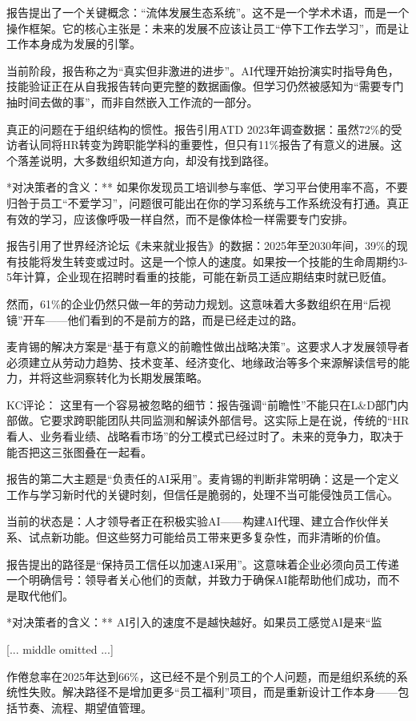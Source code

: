 \documentclass[11pt]{ctexart}
\begin{document}
报告提出了一个关键概念：“流体发展生态系统”。这不是一个学术术语，而是一个操作框架。它的核心主张是：未来的发展不应该让员工“停下工作去学习”，而是让工作本身成为发展的引擎。

当前阶段，报告称之为“真实但非激进的进步”。AI代理开始扮演实时指导角色，技能验证正在从自我报告转向更完整的数据画像。但学习仍然被感知为“需要专门抽时间去做的事”，而非自然嵌入工作流的一部分。

真正的问题在于组织结构的惯性。报告引用ATD 2023年调查数据：虽然72\%的受访者认同将HR转变为跨职能学科的重要性，但只有11\%报告了有意义的进展。这个落差说明，大多数组织知道方向，却没有找到路径。

*对决策者的含义：** 如果你发现员工培训参与率低、学习平台使用率不高，不要归咎于员工“不爱学习”，问题很可能出在你的学习系统与工作系统没有打通。真正有效的学习，应该像呼吸一样自然，而不是像体检一样需要专门安排。

报告引用了世界经济论坛《未来就业报告》的数据：2025年至2030年间，39\%的现有技能将发生转变或过时。这是一个惊人的速度。如果按一个技能的生命周期约3-5年计算，企业现在招聘时看重的技能，可能在新员工适应期结束时就已贬值。

然而，61\%的企业仍然只做一年的劳动力规划。这意味着大多数组织在用“后视镜”开车——他们看到的不是前方的路，而是已经走过的路。

麦肯锡的解决方案是“基于有意义的前瞻性做出战略决策”。这要求人才发展领导者必须建立从劳动力趋势、技术变革、经济变化、地缘政治等多个来源解读信号的能力，并将这些洞察转化为长期发展策略。

KC评论： 这里有一个容易被忽略的细节：报告强调“前瞻性”不能只在L\&D部门内部做。它要求跨职能团队共同监测和解读外部信号。这实际上是在说，传统的“HR看人、业务看业绩、战略看市场”的分工模式已经过时了。未来的竞争力，取决于能否把这三张图叠在一起看。

报告的第二大主题是“负责任的AI采用”。麦肯锡的判断非常明确：这是一个定义工作与学习新时代的关键时刻，但信任是脆弱的，处理不当可能侵蚀员工信心。

当前的状态是：人才领导者正在积极实验AI——构建AI代理、建立合作伙伴关系、试点新功能。但这些努力可能给员工带来更多复杂性，而非清晰的价值。

报告提出的路径是“保持员工信任以加速AI采用”。这意味着企业必须向员工传递一个明确信号：领导者关心他们的贡献，并致力于确保AI能帮助他们成功，而不是取代他们。

*对决策者的含义：** AI引入的速度不是越快越好。如果员工感觉AI是来“监

[... middle omitted ...]

作倦怠率在2025年达到66\%，这已经不是个别员工的个人问题，而是组织系统的系统性失败。解决路径不是增加更多“员工福利”项目，而是重新设计工作本身——包括节奏、流程、期望值管理。
\end{document}
